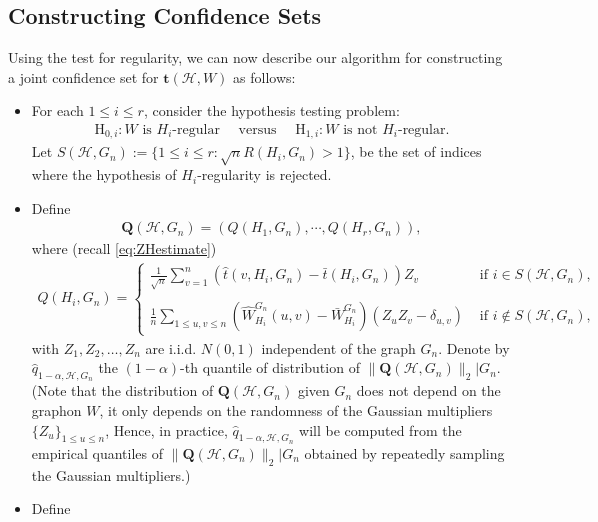 \documentclass[11pt,reqno]{amsart}
\numberwithin{equation}{section}
\newcommand{\cH}{{\mathcal H}}
\theoremstyle{definition}
\begin{document}
\subsection{Constructing Confidence Sets} 
\label{sec:methodLHW}
Using the test for regularity, we can now describe our algorithm for constructing a joint confidence set for $\bm t(\cH, W)$ as follows: 
\begin{itemize} 
\item For each $1 \leq i \leq r$, consider the hypothesis testing problem: 
\begin{align*}
	\mathrm{H}_{0, i} :W \text{ is } H_i \text{-regular} \quad \text{ versus } \quad \mathrm{H}_{1, i}: W \text{ is not } H_i \text{-regular} . 
\end{align*}
Let $S(\cH, G_n) := \{ 1 \leq i \leq r: \sqrt n R(H_i, G_n)  > 1 \} $, 
be the set of indices where the hypothesis of $H_i$-regularity is rejected.
\item Define 
\begin{align}\label{eq:def-QWGn}
    \bm{Q}(\mathcal{H}, G_{n}) = (Q(H_{1}, G_{n}),\cdots, Q(H_{r}, G_{n})) , 
\end{align}
where (recall \eqref{eq:ZHestimate}) 
\begin{align*}
    Q (H_i, G_{n}) = 
    \begin{cases}
        \frac{1}{\sqrt n}\sum_{v=1}^{n} ( \hat t(v, H_i, G_n) -  \bar t(H_i, G_n) ) Z_v  & \text{ if }  i \in S(\cH, G_n), \\ \\ 
   \frac{1}{n} \sum_{1 \leq u, v \leq n} ( \hat W^{G_n}_{H_i}(u, v) - \bar W^{G_n}_{H_i} ) \left(Z_{u}Z_{v} - \delta_{u, v}\right) & \text{ if } i \notin S(\cH, G_n) , 
    \end{cases} 
\end{align*} 
    with $Z_1, Z_2, \ldots, Z_n$ are i.i.d. $N(0, 1)$ independent of the graph $G_n$.  Denote by $\hat{q}_{1-\alpha, \mathcal H, G_n}$ the $(1-\alpha)$-th quantile of distribution of $\| \bm{Q}(\mathcal{H}, G_{n}) \|_2|G_n$. (Note that the distribution of $\bm{Q}(\mathcal{H}, G_{n})$ given $G_n$ does not depend on the graphon $W$, it only depends on the randomness of the Gaussian multipliers $\{Z_u\}_{1 \leq u \leq n}$, Hence, in practice, $\hat{q}_{1-\alpha, \mathcal H, G_n}$ will be computed from the empirical quantiles of $\| \bm{Q}(\mathcal{H}, G_{n}) \|_2|G_n$ obtained by repeatedly sampling the Gaussian multipliers.) 
\item Define 
\begin{align}\label{eq:jointZHGn}

\end{align}
\end{itemize}
\end{document}
